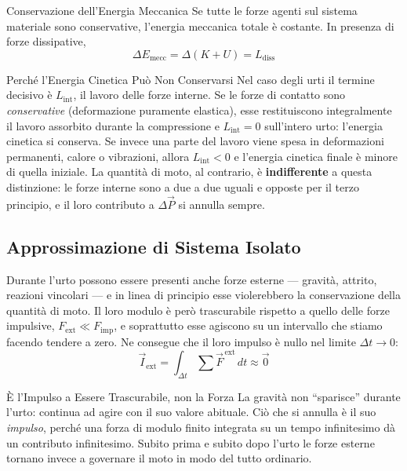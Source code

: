 \begin{teorema}{Conservazione dell'Energia Meccanica}
Se tutte le forze agenti sul sistema materiale sono conservative, l'energia meccanica totale è costante. In presenza di forze dissipative,
\begin{equation}
    \Delta E_{\text{mecc}} = \Delta (K + U) = L_{\text{diss}}
\end{equation}
\end{teorema}

\begin{osservazione}{Perché l'Energia Cinetica Può Non Conservarsi}
Nel caso degli urti il termine decisivo è $L_{\text{int}}$, il lavoro delle forze interne. Se le forze di contatto sono \emph{conservative} (deformazione puramente elastica), esse restituiscono integralmente il lavoro assorbito durante la compressione e $L_{\text{int}} = 0$ sull'intero urto: l'energia cinetica si conserva. Se invece una parte del lavoro viene spesa in deformazioni permanenti, calore o vibrazioni, allora $L_{\text{int}} < 0$ e l'energia cinetica finale è minore di quella iniziale. La quantità di moto, al contrario, è \textbf{indifferente} a questa distinzione: le forze interne sono a due a due uguali e opposte per il terzo principio, e il loro contributo a $\Delta\vec{P}$ si annulla sempre.
\end{osservazione}

\subsection{Approssimazione di Sistema Isolato}

Durante l'urto possono essere presenti anche forze esterne --- gravità, attrito, reazioni vincolari --- e in linea di principio esse violerebbero la conservazione della quantità di moto. Il loro modulo è però trascurabile rispetto a quello delle forze impulsive, $F_{\text{ext}} \ll F_{\text{imp}}$, e soprattutto esse agiscono su un intervallo che stiamo facendo tendere a zero. Ne consegue che il loro impulso è nullo nel limite $\Delta t \to 0$:
\begin{equation}
    \vec{I}_{\text{ext}} = \int_{\Delta t} \sum \vec{F}^{\,\text{ext}} \, dt \approx \vec{0}
\end{equation}

\begin{attenzione}{È l'Impulso a Essere Trascurabile, non la Forza}
La gravità non ``sparisce'' durante l'urto: continua ad agire con il suo valore abituale. Ciò che si annulla è il suo \emph{impulso}, perché una forza di modulo finito integrata su un tempo infinitesimo dà un contributo infinitesimo. Subito prima e subito dopo l'urto le forze esterne tornano invece a governare il moto in modo del tutto ordinario.
\end{attenzione}

